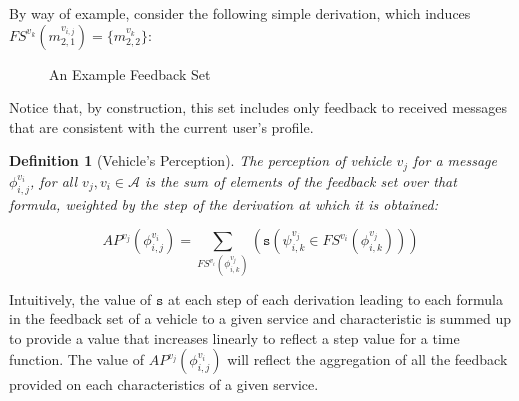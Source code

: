 \documentclass[compsoc, conference, letterpaper, 10pt, times]{IEEEtran}
\newtheorem{definition}{Definition}
\begin{document}
By way of example, consider the following simple derivation, which induces $FS^{v_{k}}(m^{v_{i,j}}_{2,1})=\{m^{v_{k}}_{2,2}\}$: 

\begin{figure*}
\begin{footnotesize}

	\begin{prooftree}
		
		\end{prooftree}
\end{footnotesize}


	\caption{An Example Feedback Set}\label{fig:ask}

\end{figure*}

Notice that, by construction, this set includes only feedback to received messages that are consistent with the current user's profile. 

\begin{definition}[Vehicle's Perception]
The perception of vehicle $v_{j}$ for a message $\phi^{v_{i}}_{i,j}$, for all $v_{j}, v_{i} \in \mathcal{A}$ is the sum of elements of the feedback set over that formula, weighted by the step of the derivation at which it is obtained: 

\[
AP^{v_{j}}(\phi^{v_{i}}_{i,j})=\sum_{FS^{v_{i}}(\phi^{v_{j}}_{i,k})}(\mathtt{s}(\psi^{v_{j}}_{i,k} \in FS^{v_{i}}(\phi^{v_{j}}_{i,k})))
\]

\end{definition}

Intuitively, the value of $\mathtt{s}$ at each step of each derivation leading to each formula in the feedback set of a vehicle to a given service and characteristic is summed up to provide a value that increases linearly to reflect a step value for a time function. The value of $AP^{v_{j}}(\phi^{v_{i}}_{i,j})$ will reflect the aggregation of all the feedback provided on each characteristics of a given service.  
\end{document}
